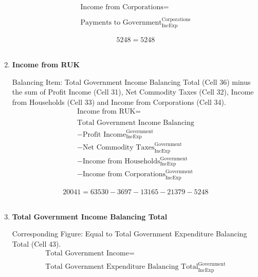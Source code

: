 \begin{enumerate}
\begin{equation}
\begin{split}
\text{Income from Corporations} =  \\ \\
\text{Payments to Government}^\text{Corporations}_\text{IncExp}
\end{split} \label{eq:2.5.38}
\end{equation}

\begin{equation} \nonumber
5248 = 5248
\end{equation}\\

\newpage

\item \textbf {Income from RUK}

Balancing Item: Total Government Income Balancing Total (Cell 36) minus the sum of Profit Income (Cell 31), Net Commodity Taxes (Cell 32), Income from Households (Cell 33) and Income from Corporations (Cell 34).\\

\begin{equation}
\begin{split}
\text{Income from RUK} =  \\ \\
\text{Total Government Income Balancing}\\
-\text{Profit Income}^\text{Government}_\text{IncExp}\\
-\text{Net Commodity Taxes}^\text{Government}_\text{IncExp}\\
-\text{Income from Households}^\text{Government}_\text{IncExp}\\
-\text{Income from Corporations}^\text{Government}_\text{IncExp}
\end{split} \label{eq:2.5.39}
\end{equation}

\begin{equation} \nonumber
20041 = 63530-3697-13165-21379-5248
\end{equation}\\


\item \textbf {Total Government Income Balancing Total}

Corresponding Figure: Equal to Total Government Expenditure Balancing Total (Cell 43).\\

\begin{equation}
\begin{split}
\text{Total Government Income} =  \\ \\
\text{Total Government Expenditure Balancing Total}^\text{Government}_\text{IncExp}
\end{split} \label{eq:2.5.40}
\end{equation}


\end{enumerate}
